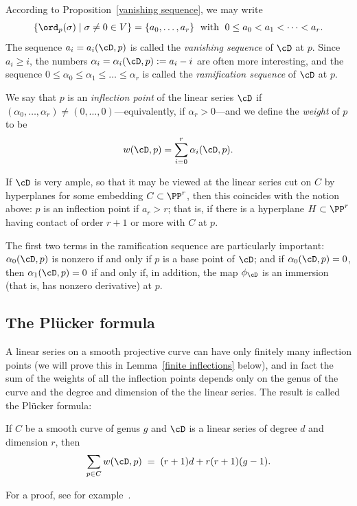 According to  Proposition~\ref{vanishing sequence}, we may write
$$
\{ \ord_p(\sigma) \mid \sigma \neq 0 \in V \} = \{a_0,\dots,a_r\} \; \text{ with } \; 0\leq a_0 < a_1 < \dots < a_r.
$$
The sequence $a_i = a_i(\cD,p)$ is called the \emph{vanishing sequence} of $\cD$ at $p$.  Since $a_i \geq i$, the numbers $\alpha_i = \alpha_i(\cD,p) := a_i - i$ are often more interesting, and the sequence $0 \leq \alpha_0 \leq \alpha_1 \leq \dots \leq \alpha_r$ is called the \emph{ramification sequence} of $\cD$ at $p$. 

We say that $p$ is an \emph{inflection point} of the linear series $\cD$ if $(\alpha_0,\dots,\alpha_r) \neq (0,\dots,0)$---equivalently, if $\alpha_r > 0$---and we define the \emph{weight} of $p$ to be
$$
w(\cD, p) = \sum_{i=0}^r \alpha_i(\cD, p).
$$

If $\cD$ is very ample, so that it may be viewed at the linear series cut on $C$ by hyperplanes for some embedding $C \subset \PP^r$, then this coincides with the notion above: $p$ is an inflection point if $a_r > r$; that is, if there is a hyperplane $H \subset \PP^r$ having contact of order $r+1$ or more with $C$ at $p$.

The first two terms in the ramification sequence are particularly important: $\alpha_0(\cD, p)$ is nonzero if and only if $p$ is a base point of $\cD$; and if $\alpha_0(\cD, p)=0$, then $\alpha_1(\cD, p) = 0$ if and only if, in addition, the map $\phi_\cD$ is an immersion (that is, has nonzero derivative) at $p$.


\subsection{The Pl\"ucker formula}

A linear series on a smooth projective curve can have only finitely many inflection points (we will prove this in Lemma~\ref{finite inflections} below), and in fact the sum of the weights of all the inflection points depends only on the genus of the curve and the degree and dimension of the the linear series. The result is called the Pl\"ucker formula:

\begin{theorem}\label{Plucker}
If $C$ be a smooth curve of genus $g$ and $\cD$ is a
linear series of degree $d$ and dimension $r$, then
 \begin{equation}\label{Plucker formula}
\sum_{p \in C} w(\cD, p) \; = \; (r+1)d + r(r+1)(g-1).
\end{equation}
\end{theorem}
For a proof, see for example~\cite[Theorem 7.13]{allthat}.

